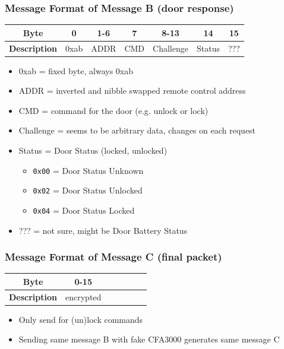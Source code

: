 \documentclass[aspectratio=169]{beamer}
\begin{document}
\begin{frame}
	\frametitle{Message Format of Message B (door response)}

	\begin{center}
		\begin{tabular}{|c|c|c|c|c|c|c|}
			\hline
			\textbf{Byte}        & 0    & 1-6  & 7   & 8-13 & 14 & 15 \\
			\hline
			\textbf{Description} & 0xab & ADDR & CMD & Challenge & Status & ??? \\
			\hline
		\end{tabular}
	\end{center}

	\begin{itemize}
		\item 0xab = fixed byte, always 0xab
		\item ADDR = inverted and nibble swapped remote control address
		\item CMD = command for the door (e.g. unlock or lock)
		\item Challenge = seems to be arbitrary data, changes on each request
		\item Status = Door Status (locked, unlocked)
			\begin{itemize}
				\item \texttt{0x00} = Door Status Unknown
				\item \texttt{0x02} = Door Status Unlocked
				\item \texttt{0x04} = Door Status Locked
			\end{itemize}
		\item ??? = not sure, might be Door Battery Status
	\end{itemize}
\end{frame}

\begin{frame}
	\frametitle{Message Format of Message C (final packet)}

	\begin{center}
		\begin{tabular}{|c|c|c|c|c|c|c|}
			\hline
			\textbf{Byte}        & 0-15 \\
			\hline
			\textbf{Description} & encrypted \\
			\hline
		\end{tabular}
	\end{center}

	\begin{itemize}
		\item Only send for (un)lock commands
		\item Sending same message B with fake CFA3000 generates same message C
	\end{itemize}
\end{frame}
\end{document}
